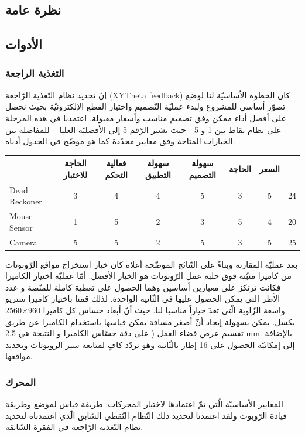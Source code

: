 \subsection{نظرة عامة}



\subsection{الأدوات}
\subsubsection{التغذية الراجعة}
إنّ تحديد نظام التّغذية الرّاجعة (XYTheta feedback) كان الخطوة الأساسيّة لنا لوضع تصوّر أساسي للمشروع ولبدء عمليّة التّصميم واختيار القطع الإلكترونيّة بحيث نحصل على أفضل أداء ممكن وفق تصميم مناسب وأسعار مقبولة. اعتمدنا في هذه المرحلة على نظام نقاط بين 1 و 5 - حيث يشير الرّقم 5 إلى الأفضليّة العليا – للمفاضلة بين الخيارات المتاحة وفق معايير محدّدة كما هو موضّح في الجدول أدناه.

\begin{table}[h]
	\begin{tabular}{lccccccc|}
		\cline{2-8}
	\multicolumn{1}{l|}{} & الحاجة للاختبار  &  فعالية التحكم & سهولة التطبيق & سهولة التصميم  & الحاجة  & السعر &    \\ \hline
		\multicolumn{1}{|l}{Dead Reckoner} & 3 & 4 & 4 & 5 & 3 & 5 & 24 \\ \hline
		\multicolumn{1}{|l}{Mouse Sensor}  & 1 & 5 & 2 & 3 & 5 & 4 & 20 \\ \hline
		\multicolumn{1}{|l}{Camera}        & 5 & 5 & 2 & 5 & 3 & 5 & 25 \\ \hline
	\end{tabular}
\end{table}


بعد عمليّة المقارنة وبناءً على النّتائج الموضّحة أعلاه كان خيار استخراج مواقع الرّوبوتات من كاميرا مثبّتة فوق حلبة عمل الرّوبوتات هو الخيار الأفضل. 
أمّا عمليّة اختيار الكاميرا فكانت ترتكز على معيارين أساسين وهما الحصول على تغطية كاملة للمنّصة و عدد الأطر التي يمكن الحصول عليها في الثّانية الواحدة. لذلك قمنا باختيار كاميرا ستريو واسعة الزّاوية الّتي تعدّ خياراً مناسبا لنا. حيث أنّ  أبعاد حساس كل كاميرا 960×2560 بكسل. يمكن بسهولة إيجاد أنّ أصغر مسافة يمكن قياسها باستخدام الكاميرا عن طريق تقسيم عرض فضاء العمل ( على دقة حسّاس الكاميرا و النتيجة هي 2.5 mm. بالإضافة إلى إمكانيّة الحصول على 16 إطار بالثّانية وهو تردّد كافٍ لمتابعة سير الروبوتات وتحديد مواقعها.

\subsubsection{المحرك}
المعايير الأساسيّة الّتي تمّ اعتمادها لاختيار المحركات: طريقة قياس لموضع وطريقة قيادة الرّوبوت ولقد اعتمدنا لتحديد ذلك النّظام النّقطي السّابق الّذي اعتمدناه لتحديد نظام التّغذية الرّاجعة في الفقرة السّابقة.

